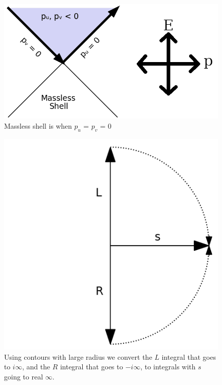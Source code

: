 \documentclass[12pt,a4paper]{article}
\begin{document}
\begin{figure}[h]
\centering
\includegraphics[scale=0.5]{massless_shell.png}
\caption{Massless shell is when $p_u$ = $p_v$ = 0}
\label{masslessshell}
\end{figure}

\begin{figure}[h]
\centering
\includegraphics[scale=0.3]{contour.png}
\caption{Using contours with large radius we convert the $L$ integral that goes to $i\infty$, and the $R$ integral that goes to $-i\infty$, to integrals with $s$ going to real $\infty$.}
\label{fig:x cubed graph}
\end{figure}
\end{document}

